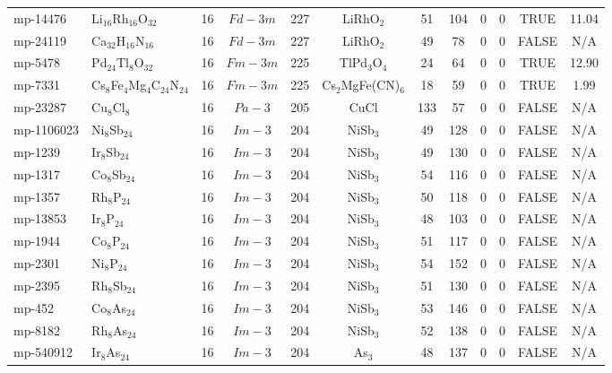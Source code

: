 {\begin{longtable}{llcccccccccc}
    mp-14476 & Li$_{16}$Rh$_{16}$O$_{32}$ & 16    & $Fd-3m$ & 227   & LiRhO$_{2}$ & 51    & 104   & 0     & 0     & TRUE  & 11.04  \\
    mp-24119 & Ca$_{32}$H$_{16}$N$_{16}$ & 16    & $Fd-3m$ & 227   & LiRhO$_{2}$ & 49    & 78    & 0     & 0     & FALSE & N/A \\
    mp-5478 & Pd$_{24}$Tl$_{8}$O$_{32}$ & 16    & $Fm-3m$ & 225   & TlPd$_{3}$O$_{4}$ & 24    & 64    & 0     & 0     & TRUE  & 12.90  \\
    mp-7331 & Cs$_{8}$Fe$_{4}$Mg$_{4}$C$_{24}$N$_{24}$ & 16    & $Fm-3m$ & 225   & Cs$_{2}$MgFe(CN)$_{6}$ & 18    & 59    & 0     & 0     & TRUE  & 1.99  \\
    mp-23287 & Cu$_{8}$Cl$_{8}$ & 16    & $Pa-3$ & 205   & CuCl  & 133   & 57    & 0     & 0     & FALSE & N/A \\
    mp-1106023 & Ni$_{8}$Sb$_{24}$ & 16    & $Im-3$ & 204   & NiSb$_{3}$ & 49    & 128   & 0     & 0     & FALSE & N/A \\
    mp-1239 & Ir$_{8}$Sb$_{24}$ & 16    & $Im-3$ & 204   & NiSb$_{3}$ & 49    & 130   & 0     & 0     & FALSE & N/A \\
    mp-1317 & Co$_{8}$Sb$_{24}$ & 16    & $Im-3$ & 204   & NiSb$_{3}$ & 54    & 116   & 0     & 0     & FALSE & N/A \\
    mp-1357 & Rh$_{8}$P$_{24}$ & 16    & $Im-3$ & 204   & NiSb$_{3}$ & 50    & 118   & 0     & 0     & FALSE & N/A \\
    mp-13853 & Ir$_{8}$P$_{24}$ & 16    & $Im-3$ & 204   & NiSb$_{3}$ & 48    & 103   & 0     & 0     & FALSE & N/A \\
    mp-1944 & Co$_{8}$P$_{24}$ & 16    & $Im-3$ & 204   & NiSb$_{3}$ & 51    & 117   & 0     & 0     & FALSE & N/A \\
    mp-2301 & Ni$_{8}$P$_{24}$ & 16    & $Im-3$ & 204   & NiSb$_{3}$ & 54    & 152   & 0     & 0     & FALSE & N/A \\
    mp-2395 & Rh$_{8}$Sb$_{24}$ & 16    & $Im-3$ & 204   & NiSb$_{3}$ & 51    & 130   & 0     & 0     & FALSE & N/A \\
    mp-452 & Co$_{8}$As$_{24}$ & 16    & $Im-3$ & 204   & NiSb$_{3}$ & 53    & 146   & 0     & 0     & FALSE & N/A \\
    mp-8182 & Rh$_{8}$As$_{24}$ & 16    & $Im-3$ & 204   & NiSb$_{3}$ & 52    & 138   & 0     & 0     & FALSE & N/A \\
    mp-540912 & Ir$_{8}$As$_{24}$ & 16    & $Im-3$ & 204   & As$_{3}$ & 48    & 137   & 0     & 0     & FALSE & N/A \\

\end{longtable}}
